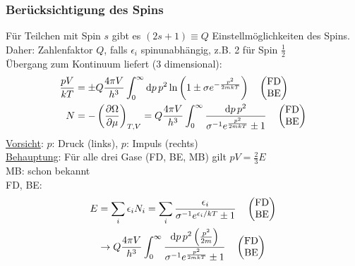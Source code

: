 \subsubsection{Berücksichtigung des Spins}
Für Teilchen mit Spin $s$ gibt es $(2s+1) \equiv Q$ Einstellmöglichkeiten des Spins. \\
Daher: Zahlenfaktor $Q$, falls $\epsilon_i$ spinunabhängig, z.B. 2 für Spin $\frac{1}{2}$ \\
Übergang zum Kontinuum liefert (3 dimensional):
\begin{equation}
    \begin{split}
        \frac{p V}{k T} &= \pm Q \frac{4 \pi V}{h^3} \int_0^\infty \mathrm{d} p\, p^2 \ln \left( 1 \pm \sigma e^{- \frac{p^2}{2 m k T}} \right) \quad \begin{pmatrix} \text{FD} \\ \text{BE} \end{pmatrix} \\
        N &= - \left( \frac{\partial \Omega}{\partial \mu} \right)_{T, V} = Q \frac{4 \pi V}{h^3} \int_0^\infty \frac{\mathrm{d} p \, p^2}{\sigma^{-1} e^{\frac{p^2}{2 m k T}} \pm 1} \quad \begin{pmatrix} \text{FD} \\ \text{BE} \end{pmatrix}
    \end{split}
\end{equation}
\underline{Vorsicht}: $p$: Druck (links), $p$: Impuls (rechts) \\
\underline{Behauptung}: Für alle drei Gase (FD, BE, MB) gilt $p V = \frac{2}{3} E$\\
MB: schon bekannt \\ %
FD, BE:
\begin{equation}
    \begin{split}
    E &= \sum_i \epsilon_i N_i = \sum_i \frac{\epsilon_i}{\sigma^{-1} e^{\epsilon_i / k T} \pm 1} \quad \begin{pmatrix} \text{FD} \\ \text{BE} \end{pmatrix} \\
    &\rightarrow Q \frac{4 \pi V}{h^3} \int_0^\infty \frac{\mathrm{d} p \, p^2 \left( \frac{p^2}{2 m} \right) }{\sigma^{-1} e^{\frac{p^2}{2 m k T}} \pm 1} \quad \begin{pmatrix} \text{FD} \\ \text{BE} \end{pmatrix}
    \end{split}
\end{equation}
